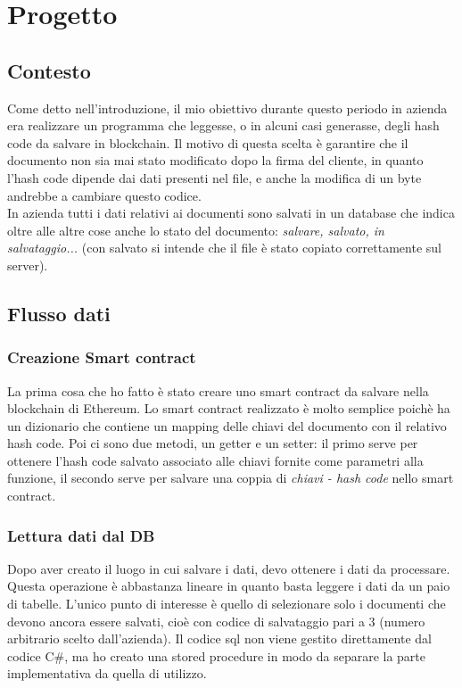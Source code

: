 \section{Progetto}
    \subsection{Contesto}
    Come detto nell'introduzione, il mio obiettivo durante questo periodo in azienda era realizzare un programma che leggesse, o in alcuni casi generasse, degli hash code da salvare in blockchain. Il motivo di questa scelta è garantire che il documento non sia mai stato modificato dopo la firma del cliente, in quanto l'hash code dipende dai dati presenti nel file, e anche la modifica di un byte andrebbe a cambiare questo codice.\\
    In azienda tutti i dati relativi ai documenti sono salvati in un database che indica oltre alle altre cose anche lo stato del documento: \textit{salvare, salvato, in salvataggio...} (con salvato si intende che il file è stato copiato correttamente sul server).
    
    
    \subsection{Flusso dati}
        \subsubsection{Creazione Smart contract}
        La prima cosa che ho fatto è stato creare uno smart contract da salvare nella blockchain di Ethereum. Lo smart contract realizzato è molto semplice poichè ha un dizionario che contiene un mapping delle chiavi del documento con il relativo hash code. Poi ci sono due metodi, un getter e un setter: il primo serve per ottenere l'hash code salvato associato alle chiavi fornite come parametri alla funzione, il secondo serve per salvare una coppia di \textit{chiavi - hash code} nello smart contract.
        
        \subsubsection{Lettura dati dal DB}
        Dopo aver creato il luogo in cui salvare i dati, devo ottenere i dati da processare. Questa operazione è abbastanza lineare in quanto basta leggere i dati da un paio di tabelle. L'unico punto di interesse è quello di selezionare solo i documenti che devono ancora essere salvati, cioè con codice di salvataggio pari a 3 (numero arbitrario scelto dall'azienda).
        Il codice sql non viene gestito direttamente dal codice C\#, ma ho creato una stored procedure in modo da separare la parte implementativa da quella di utilizzo.
        
